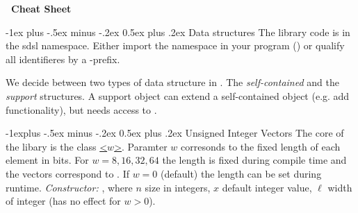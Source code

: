 \documentclass[10pt,landscape]{article}
\makeatletter
\renewcommand{\section}{\@startsection{section}{1}{0mm}%
                                {-1ex plus -.5ex minus -.2ex}%
                                {0.5ex plus .2ex}%
                                {\normalfont\large\bfseries}}
\renewcommand{\subsection}{\@startsection{subsection}{2}{0mm}%
                                {-1explus -.5ex minus -.2ex}%
                                {0.5ex plus .2ex}%
                                {\normalfont\normalsize\bfseries}}
\makeatother
\begin{document}
\begin{multicols}{3}
\newcommand{\sdsllcpbitcompressed}{\code{lcp\_bitcompressed}}
\newcommand{\sdsllcpdac}{\code{lcp\_dac}}
\newcommand{\sdsllcpvlc}{\code{lcp\_vlc}}
\newcommand{\sdsllcpbyte}{\code{lcp\_byte}}
\newcommand{\sdsllcpsupportsada}{\code{lcp\_support\_sada}}
\newcommand{\sdsllcpwt}{\code{lcp\_wt}}
\newcommand{\sdsllcpsupporttree}{\code{lcp\_support\_tree}}
\newcommand{\sdsllcpsupporttreeII}{\code{lcp\_support\_tree2}}
\newcommand{\sdslbpsupportg}{\code{bp\_support\_g}}
\newcommand{\sdslbpsupportgg}{\code{bp\_support\_gg}}
\newcommand{\sdslbpsupportsada}{\code{bp\_support\_sada}}
\newcommand{\sdslcstsada}{\code{cst\_sada}}
\newcommand{\sdslcstsctIII}{\code{cst\_sct3}}
\newcommand{\sdslrmqsupportsparsetable}{\code{rmq\_support\_sparse\_table}}
\newcommand{\sdslrmqsuccinctsada}{\code{rmq\_succint\_sada}}
\newcommand{\sdslrmqsuccinctsct}{\code{rmq\_succint\_sct}}

\begin{center}
     \Large{\textbf{\sdsl\ Cheat Sheet}} \\
\end{center}

\section{Data structures}
The library code is in the sdsl namespace. Either import
the namespace in your program () or
qualify all identifieres by a -prefix.

We decide between two types of data structure in \sdsl.
The \emph{self-contained} and the \emph{support}
structures. A support object  can extend
a self-contained object  (e.g. add functionality), but 
needs access to . 

\subsection{Unsigned Integer Vectors}
The core of the libary is the class 
\href{\sdslgit/include/sdsl/int_vector.hpp}{\sdslintvector\textless$w$\textgreater}.
Paramter $w$ corresonds to the fixed length of each
element in bits.  For $w=8,16,32,64$ the length is
fixed during compile time and the vectors
correspond to \href{http://www.sgi.com/tech/stl/Vector.html}{}. 
If $w=0$ (default) the length can be set during runtime.
\textit{Constructor:} \sdslintvectorZ{}, where
$n$ size in integers, $x$ default integer value, $\ell$ width
of integer (has no effect for $w>0$).


\end{multicols}
\end{document}

